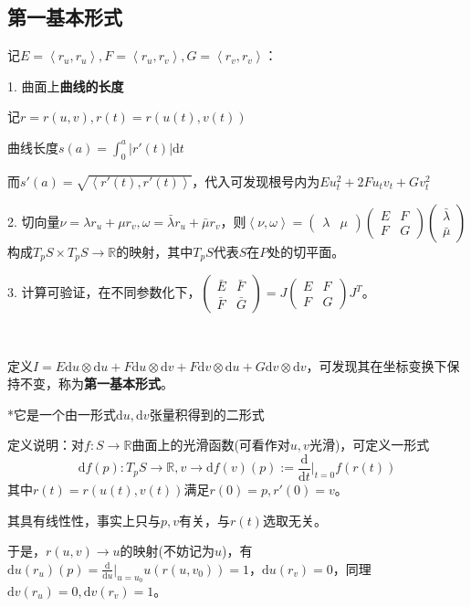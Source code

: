 \documentclass[a4paper,UTF8,fontset=windows]{ctexart}
\begin{document}
\subsection{第一基本形式}
记$E=\left<r_u,r_u\right>,F=\left<r_u,r_v\right>,G=\left<r_v,r_v\right>$：

1. 曲面上\textbf{曲线的长度}

记$r=r(u,v),r(t)=r(u(t),v(t))$

曲线长度$s(a)=\int_0^a|r'(t)|\mathrm{d}t$

而$s'(a)=\sqrt{\left<r'(t),r'(t)\right>}$，代入可发现根号内为$Eu_t^2+2Fu_tv_t+Gv_t^2$

2. 切向量$\nu=\lambda r_u+\mu r_v,\omega=\bar{\lambda}r_u+\bar{\mu}r_v$，则$\left<\nu,\omega\right>=\begin{pmatrix}\lambda&\mu\end{pmatrix}\begin{pmatrix}E&F\\F&G\end{pmatrix}\begin{pmatrix}\bar{\lambda}\\\bar{\mu}\end{pmatrix}$构成$T_pS\times T_pS\to\mathbb{R}$的映射，其中$T_pS$代表$S$在$P$处的切平面。

3. 计算可验证，在不同参数化下，$\begin{pmatrix}\bar{E}&\bar{F}\\\bar{F}&\bar{G}\end{pmatrix}=J\begin{pmatrix}E&F\\F&G\end{pmatrix}J^T$。

\

定义$I=E\mathrm{d}u\otimes\mathrm{d}u+F\mathrm{d}u\otimes\mathrm{d}v+F\mathrm{d}v\otimes\mathrm{d}u+G\mathrm{d}v\otimes\mathrm{d}v$，可发现其在坐标变换下保持不变，称为\textbf{第一基本形式}。

*它是一个由一形式$\mathrm{d}u,\mathrm{d}v$张量积得到的二形式

定义说明：对$f:S\to\mathbb{R}$曲面上的光滑函数(可看作对$u,v$光滑)，可定义一形式$$\mathrm{d}f(p):T_pS\to\mathbb{R},v\to\mathrm{d}f(v)(p):=\frac{\mathrm{d}}{\mathrm{d}t}\bigg|_{t=0}f(r(t))$$其中$r(t)=r(u(t),v(t))$满足$r(0)=p,r'(0)=v$。

其具有线性性，事实上只与$p,v$有关，与$r(t)$选取无关。

于是，$r(u,v)\to u$的映射(不妨记为$u$)，有$\mathrm{d}u(r_u)(p)=\frac{\mathrm{d}}{\mathrm{d}u}\big|_{u=u_0}u(r(u,v_0))=1$，$\mathrm{d}u(r_v)=0$，同理$\mathrm{d}v(r_u)=0,\mathrm{d}v(r_v)=1$。
\end{document}
